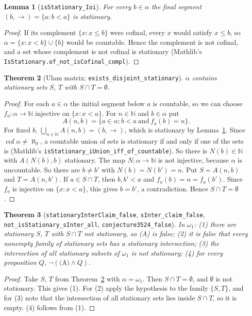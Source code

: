 \documentclass[11pt]{article}
\newtheorem{theorem}{Theorem}
\newtheorem{lemma}[theorem]{Lemma}
\theoremstyle{definition}
\theoremstyle{remark}
\begin{document}
\begin{lemma}[\texttt{isStationary\_Ioi}]\label{lem:tail}
For every $b\in\alpha$ the final segment $(b,\to) = \{a : b < a\}$ is stationary.
\end{lemma}
\begin{proof}
If its complement $\{x : x\le b\}$ were cofinal, every $x$ would satisfy $x\le b$, so
$\alpha = \{x : x<b\}\cup\{b\}$ would be countable. Hence the complement is not cofinal, and a
set whose complement is not cofinal is stationary (Mathlib's
\texttt{IsStationary.of\_not\_isCofinal\_compl}).
\end{proof}

\begin{theorem}[Ulam matrix; \texttt{exists\_disjoint\_stationary}]\label{thm:ulam}
$\alpha$ contains stationary sets $S$, $T$ with $S\cap T=\emptyset$.
\end{theorem}
\begin{proof}
For each $a\in\alpha$ the initial segment below $a$ is countable, so we can choose
$f_a:\alpha\to\mathbb{N}$ injective on $\{x : x<a\}$. For $n\in\mathbb{N}$ and $b\in\alpha$ put
\[
  A(n,b) = \{a\in\alpha : b<a \ \text{and}\ f_a(b)=n\}.
\]
For fixed $b$, $\bigcup_{n\in\mathbb{N}} A(n,b) = (b,\to)$, which is stationary by
Lemma~\ref{lem:tail}. Since $\operatorname{cof}\alpha\neq\aleph_0$, a countable union of sets
is stationary if and only if one of the sets is (Mathlib's
\texttt{isStationary\_iUnion\_iff\_of\_countable}). So there is $N(b)\in\mathbb{N}$ with
$A(N(b),b)$ stationary. The map $N:\alpha\to\mathbb{N}$ is not injective, because $\alpha$ is
uncountable. So there are $b\ne b'$ with $N(b)=N(b')=n$. Put $S=A(n,b)$ and $T=A(n,b')$. If
$a\in S\cap T$, then $b,b'<a$ and $f_a(b)=n=f_a(b')$. Since $f_a$ is injective on
$\{x : x<a\}$, this gives $b=b'$, a contradiction. Hence $S\cap T=\emptyset$.
\end{proof}

\begin{theorem}[\texttt{stationaryInterClaim\_false}, \texttt{sInter\_claim\_false},
\texttt{not\_isStationary\_sInter\_all}, \texttt{conjecture3524\_false}]
In $\omega_1$:
(1) there are stationary $S$, $T$ with $S\cap T$ not stationary, so (A) is false;
(2) it is false that every nonempty family of stationary sets has a stationary intersection;
(3) the intersection of all stationary subsets of $\omega_1$ is not stationary;
(4) for every proposition $Q$, $\neg(\text{(A)}\wedge Q)$.
\end{theorem}
\begin{proof}
Take $S$, $T$ from Theorem~\ref{thm:ulam} with $\alpha=\omega_1$. Then $S\cap T=\emptyset$, and
$\emptyset$ is not stationary. This gives (1). For (2) apply the hypothesis to the family
$\{S,T\}$, and for (3) note that the intersection of all stationary sets lies inside $S\cap T$,
so it is empty. (4) follows from (1).
\end{proof}
\end{document}
